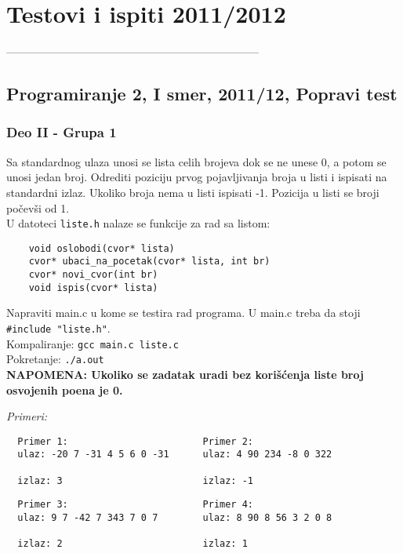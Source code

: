 \chapter{Testovi i ispiti 2011/2012}


---------------------------------------------------------------------
\section{Programiranje 2, I smer, 2011/12, Popravi test}

\subsection{Deo II - Grupa 1}

Sa standardnog ulaza unosi se lista celih brojeva dok se ne unese 0, a potom se unosi jedan broj.
Odrediti poziciju prvog pojavljivanja broja u listi i ispisati na standardni izlaz. Ukoliko broja nema u listi ispisati -1.
Pozicija u listi se broji po\v cev\v si od 1.\\

    \noindent U datoteci \verb|liste.h| nalaze se funkcije za rad sa listom:
    \begin{verbatim}
    void oslobodi(cvor* lista)
    cvor* ubaci_na_pocetak(cvor* lista, int br)
    cvor* novi_cvor(int br)
    void ispis(cvor* lista)
    \end{verbatim}

    \noindent Napraviti main.c u kome se testira rad programa. U main.c treba da stoji \verb|#include "liste.h"|. \\
    Kompaliranje:   \verb|gcc main.c liste.c|\\
    Pokretanje: \verb|./a.out|\\

  \textbf{NAPOMENA: Ukoliko se zadatak uradi bez kori\v s\' cenja liste broj osvojenih poena je 0.}

\emph{Primeri:}
\begin{verbatim}
  Primer 1:                        Primer 2:
  ulaz: -20 7 -31 4 5 6 0 -31      ulaz: 4 90 234 -8 0 322

  izlaz: 3                         izlaz: -1

\end{verbatim}

\begin{verbatim}
  Primer 3:                        Primer 4:
  ulaz: 9 7 -42 7 343 7 0 7        ulaz: 8 90 8 56 3 2 0 8

  izlaz: 2                         izlaz: 1
\end{verbatim}

